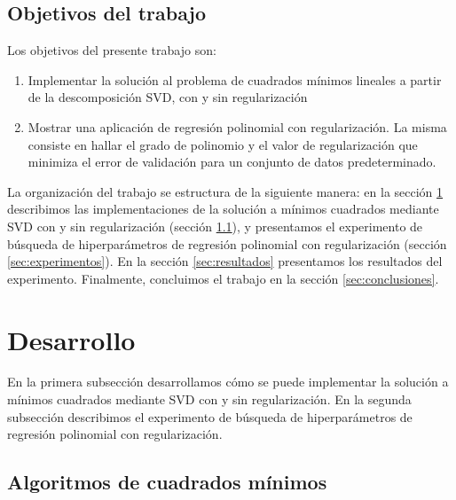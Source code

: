 \documentclass{article}
\begin{document}


\subsection{Objetivos del trabajo}

Los objetivos del presente trabajo son: 

\begin{enumerate}
    \item Implementar la solución al problema de cuadrados mínimos lineales a partir de la descomposición SVD, con y sin regularización    
    \item Mostrar una aplicación de regresión polinomial con regularización. La misma consiste en hallar el grado de polinomio y el valor de regularización que minimiza el error de validación para un conjunto de datos predeterminado. 
\end{enumerate}

La organización del trabajo se estructura de la siguiente manera: en la sección \ref{sec:desarrollo} describimos las implementaciones de la solución a mínimos cuadrados mediante SVD con y sin regularización (sección \ref{sec:algoritmos}), y presentamos el experimento de búsqueda de hiperparámetros de regresión polinomial con regularización (sección \ref{sec:experimentos}). En la sección \ref{sec:resultados} presentamos los resultados del experimento. Finalmente, concluimos el trabajo en la sección \ref{sec:conclusiones}. 

\section{Desarrollo} \label{sec:desarrollo}

En la primera subsección desarrollamos cómo se puede implementar la solución a mínimos cuadrados mediante SVD con y sin regularización. En la segunda subsección describimos el experimento de búsqueda de hiperparámetros de regresión polinomial con regularización. 


\subsection{Algoritmos de cuadrados mínimos} \label{sec:algoritmos}
\end{document}
